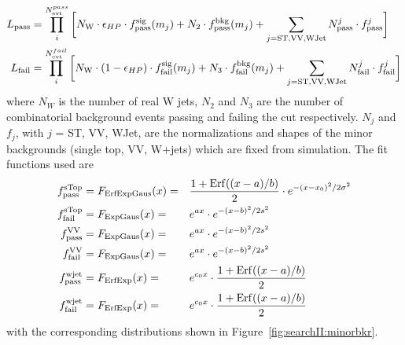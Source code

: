 \begin{align*}
\footnotesize
    L_{\rm pass} &= \prod_{i}^{N_{\rm evt}^{pass}} \bigg[N_{\rm W}\cdot\epsilon_{HP}\cdot f_{\rm pass}^{\rm sig}(m_{j}) + N_{\rm 2}\cdot f_{\rm pass}^{\rm bkg}(m_{j})+ \sum_{j=\textrm{ST,VV,WJet}} N^{j}_{\rm pass}\cdot f_{\rm pass}^{j}\bigg]\\
    L_{\rm fail} &= \prod_{i}^{N_{\rm evt}^{fail}} \bigg[N_{\rm W}\cdot(1-\epsilon_{HP})\cdot f^{\rm sig}_{\rm fail}(m_{j}) + N_{\rm 3}\cdot f_{\rm fail}^{\rm bkg}(m_{j})+ \sum_{j=\textrm{ST,VV,WJet}} N^{j}_{\rm fail}\cdot f_{\rm fail}^{j}\bigg]
\end{align*}
where $N_{W}$ is the number of real W jets, $N_{2}$ and $N_{3}$ are the number of combinatorial background events passing and failing the \nsubj cut respectively. $N_{j}$ and $f_{j}$, with $j$ = ST, VV, WJet, are the normalizations and shapes of the minor backgrounds (single top, VV, W+jets) which are fixed from simulation. The fit functions used are
\begin{alignat*}{3}
    f_{\rm pass}^{\rm sTop} &= F_{\rm ErfExpGaus}(x) = &&\frac{1 + {\rm Erf}((x-a)/b)}{2} \cdot e^{-(x-x_{0})^{2}/2\sigma^{2}}\\
    f_{\rm fail}^{\rm sTop} &= F_{\rm ExpGaus}(x)    = &&e^{ax} \cdot e^{-(x-b)^{2}/2s^{2}}\\
    f_{\rm pass}^{\rm VV}   &= F_{\rm ExpGaus}(x)    = &&e^{ax} \cdot e^{-(x-b)^{2}/2s^{2}}\\
    f_{\rm fail}^{\rm VV}   &= F_{\rm ExpGaus}(x)    = &&e^{ax} \cdot e^{-(x-b)^{2}/2s^{2}}\\
    f_{\rm pass}^{\rm wjet} &= F_{\rm ErfExp}(x)     = &&e^{c_0x} \cdot \frac{1 + {\rm Erf}((x-a)/b)}{2}\\
    f_{\rm fail}^{\rm wjet} &= F_{\rm ErfExp}(x)     = &&e^{c_0x} \cdot \frac{1 + {\rm Erf}((x-a)/b)}{2}
\end{alignat*}
with the corresponding distributions shown in Figure~\ref{fig:searchII:minorbkr}.
